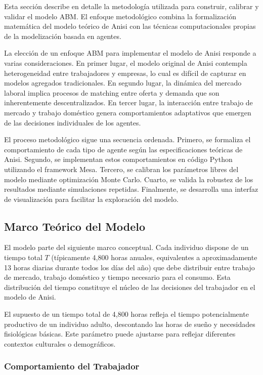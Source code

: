 Esta sección describe en detalle la metodología utilizada para construir, calibrar y validar el modelo ABM. El enfoque metodológico combina la formalización matemática del modelo teórico de Anisi con las técnicas computacionales propias de la modelización basada en agentes.

La elección de un enfoque ABM para implementar el modelo de Anisi responde a varias consideraciones. En primer lugar, el modelo original de Anisi contempla heterogeneidad entre trabajadores y empresas, lo cual es difícil de capturar en modelos agregados tradicionales. En segundo lugar, la dinámica del mercado laboral implica procesos de matching entre oferta y demanda que son inherentemente descentralizados. En tercer lugar, la interacción entre trabajo de mercado y trabajo doméstico genera comportamientos adaptativos que emergen de las decisiones individuales de los agentes.

El proceso metodológico sigue una secuencia ordenada. Primero, se formaliza el comportamiento de cada tipo de agente según las especificaciones teóricas de Anisi. Segundo, se implementan estos comportamientos en código Python utilizando el framework Mesa. Tercero, se calibran los parámetros libres del modelo mediante optimización Monte Carlo. Cuarto, se valida la robustez de los resultados mediante simulaciones repetidas. Finalmente, se desarrolla una interfaz de visualización para facilitar la exploración del modelo.

\subsection{Marco Teórico del Modelo}

El modelo parte del siguiente marco conceptual. Cada individuo dispone de un tiempo total $T$ (típicamente 4,800 horas anuales, equivalentes a aproximadamente 13 horas diarias durante todos los días del año) que debe distribuir entre trabajo de mercado, trabajo doméstico y tiempo necesario para el consumo. Esta distribución del tiempo constituye el núcleo de las decisiones del trabajador en el modelo de Anisi.

El supuesto de un tiempo total de 4,800 horas refleja el tiempo potencialmente productivo de un individuo adulto, descontando las horas de sueño y necesidades fisiológicas básicas. Este parámetro puede ajustarse para reflejar diferentes contextos culturales o demográficos.

\subsubsection{Comportamiento del Trabajador}

